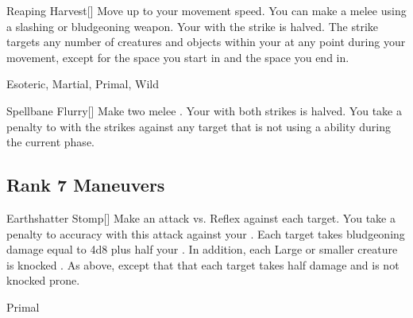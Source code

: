 \lowercase{\hypertarget{maneuver:Reaping Harvest}{}}\label{maneuver:Reaping Harvest}
\hypertarget{maneuver:Reaping Harvest}{}
\begin{freeability}[Rank 6]{Reaping Harvest}[]
Move up to your movement speed.
You can make a melee  using a slashing or bludgeoning weapon.
Your  with the strike is halved.
The strike targets any number of creatures and objects within your  at any point during your movement, except for the space you start in and the space you end in.


 Esoteric, Martial, Primal, Wild
\end{freeability}
\vspace{0.25em}



\lowercase{\hypertarget{maneuver:Spellbane Flurry}{}}\label{maneuver:Spellbane Flurry}
\hypertarget{maneuver:Spellbane Flurry}{}
\begin{freeability}[Rank 6]{Spellbane Flurry}[]
Make two melee .
Your  with both strikes is halved.
You take a  penalty to  with the strikes against any target that is not using a  ability during the current phase.


\end{freeability}
\vspace{0.25em}


\subsection{Rank 7 Maneuvers}

\lowercase{\hypertarget{maneuver:Earthshatter Stomp}{}}\label{maneuver:Earthshatter Stomp}
\hypertarget{maneuver:Earthshatter Stomp}{}
\begin{freeability}[Rank 7]{Earthshatter Stomp}[]
Make an attack vs. Reflex against each target.
You take a  penalty to accuracy with this attack against your .
\hit Each target takes bludgeoning damage equal to 4d8 plus half your .
In addition, each Large or smaller creature is knocked .
\glance As above, except that that each target takes half damage and is not knocked prone.


 Primal
\end{freeability}
\vspace{0.25em}



